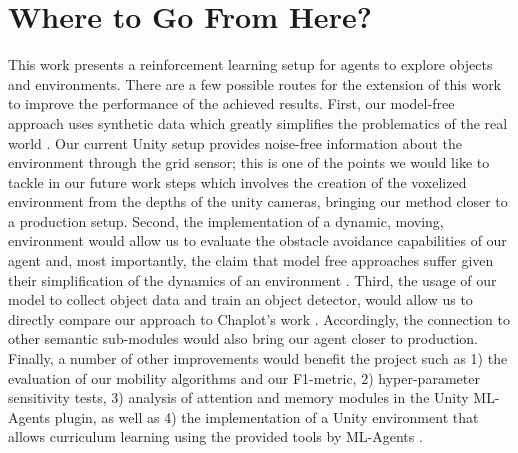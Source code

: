 
\section{Where to Go From Here?}\label{sec:future-work}
    This work presents a reinforcement learning setup for agents to explore objects and environments. There are a few possible routes for the extension of this work to improve the performance of the achieved results. 
    First, our model-free approach uses synthetic data which greatly simplifies the problematics of the real world \cite{wang2018look}. 
    Our current Unity setup provides noise-free information about the environment through the grid sensor; this is one of the points we would like to tackle in our future work steps which involves the creation of the voxelized environment from the depths of the unity cameras, bringing our method closer to a production setup.
    Second, the implementation of a dynamic, moving, environment would allow us to evaluate the obstacle avoidance capabilities of our agent and, most importantly, the claim that model free approaches suffer given their simplification of the dynamics of an environment \cite{wang2018look}.
    Third, the usage of our model to collect object data and train an object detector, would allow us to directly compare our approach to Chaplot's work \cite{chaplot2020semantic}. Accordingly, the connection to other semantic sub-modules would also bring our agent closer to production.
    Finally, a number of other improvements would benefit the project such as 1) the evaluation of our mobility algorithms and our F1-metric, 2) hyper-parameter sensitivity tests, 3) analysis of attention and memory modules in the Unity ML-Agents plugin, as well as 4) the implementation of a Unity environment that allows curriculum learning using the provided tools by ML-Agents \cite{github-unity-mlagents-toolkit}.
    
    
    
